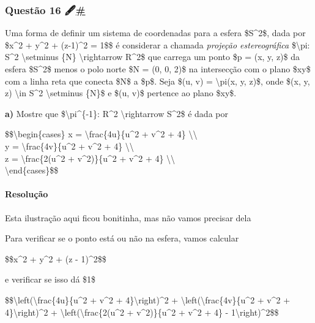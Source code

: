 \hypertarget{questuxe3o-16-}{%
\subsubsection{\texorpdfstring{Questão 16
🖋️\protect\hyperlink{questuxe3o-16-}{\#}}{Questão 16 🖋️\#}}\label{questuxe3o-16-}}

Uma forma de definir um sistema de coordenadas para a esfera \$S\^{}2\$,
dada por \$x\^{}2 + y\^{}2 + (z-1)\^{}2 = 1\$\$ é considerar a chamada
\emph{projeção estereográfica} \$\textbackslash{}pi: S\^{}2
\textbackslash{}setminus \{N\} \textbackslash{}rightarrow R\^{}2\$ que
carrega um ponto \$p = (x, y, z)\$ da esfera \$S\^{}2\$ menos o polo
norte \$N = (0, 0, 2)\$ na intersecção com o plano \$xy\$ com a linha
reta que conecta \$N\$ a \$p\$. Seja \$(u, v) = \textbackslash{}pi(x, y,
z)\$, onde \$(x, y, z) \textbackslash{}in S\^{}2
\textbackslash{}setminus \{N\}\$ e \$(u, v)\$ pertence ao plano \$xy\$.

\textbf{a)} Mostre que \$\textbackslash{}pi\^{}\{-1\}: R\^{}2
\textbackslash{}rightarrow S\^{}2\$ é dada por

\$\$\textbackslash{}begin\{cases\} x =
\textbackslash{}frac\{4u\}\{u\^{}2 + v\^{}2 + 4\}
\textbackslash{}\textbackslash{}\\
y = \textbackslash{}frac\{4v\}\{u\^{}2 + v\^{}2 + 4\}
\textbackslash{}\textbackslash{}\\
z = \textbackslash{}frac\{2(u\^{}2 + v\^{}2)\}\{u\^{}2 + v\^{}2 + 4\}
\textbackslash{}\textbackslash{}\\
\textbackslash{}end\{cases\}\$\$

\hypertarget{resoluuxe7uxe3o-7}{%
\paragraph{Resolução}\label{resoluuxe7uxe3o-7}}

Esta ilustração aqui ficou bonitinha, mas não vamos precisar dela

Para verificar se o ponto está ou não na esfera, vamos calcular

\$\$x\^{}2 + y\^{}2 + (z - 1)\^{}2\$\$

e verificar se isso dá \$1\$

\$\$\textbackslash{}left(\textbackslash{}frac\{4u\}\{u\^{}2 + v\^{}2 +
4\}\textbackslash{}right)\^{}2 +
\textbackslash{}left(\textbackslash{}frac\{4v\}\{u\^{}2 + v\^{}2 +
4\}\textbackslash{}right)\^{}2 +
\textbackslash{}left(\textbackslash{}frac\{2(u\^{}2 + v\^{}2)\}\{u\^{}2
+ v\^{}2 + 4\} - 1\textbackslash{}right)\^{}2\$\$

